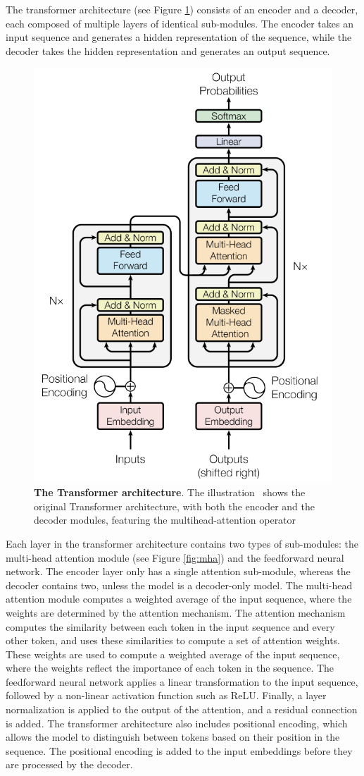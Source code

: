The transformer architecture (see Figure \ref{fig:original-transformer}) consists of an encoder and a decoder, each composed of multiple layers of identical sub-modules. The encoder takes an input sequence and generates a hidden representation of the sequence, while the decoder takes the hidden representation and generates an output sequence.

\begin{figure}[H]
    \centering
    \includegraphics[width=0.6\linewidth]{figures/transformer-architecture.png}
    \caption{\textbf{The Transformer architecture}. The illustration~\cite{transformer} shows the original Transformer architecture, with both the encoder and the decoder modules, featuring the multihead-attention operator}
    \label{fig:original-transformer}
\end{figure}

Each layer in the transformer architecture contains two types of sub-modules: the multi-head attention module (see Figure \ref{fig:mha}) and the feedforward neural network. The encoder layer only has a single attention sub-module, whereas the decoder contains two, unless the model is a decoder-only model. The multi-head attention module computes a weighted average of the input sequence, where the weights are determined by the attention mechanism. The attention mechanism computes the similarity between each token in the input sequence and every other token, and uses these similarities to compute a set of attention weights. These weights are used to compute a weighted average of the input sequence, where the weights reflect the importance of each token in the sequence. The feedforward neural network applies a linear transformation to the input sequence, followed by a non-linear activation function such as ReLU. Finally, a layer normalization is applied to the output of the attention, and a residual connection is added. The transformer architecture also includes positional encoding, which allows the model to distinguish between tokens based on their position in the sequence. The positional encoding is added to the input embeddings before they are processed by the decoder.

